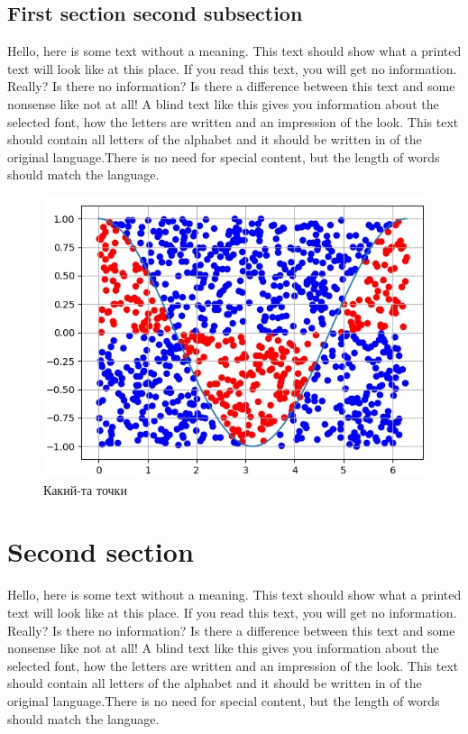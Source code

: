 \documentclass[a4paper,14pt]{extarticle}
\begin{document}
    \subsection{First section second subsection}

    Hello, here is some text without a meaning. This text should show what 
    a printed text will look like at this place. If you read this text, 
    you will get no information.  Really?  Is there no information?  Is there 
    a difference between this text and some nonsense like not at all!  A 
    blind text like this gives you information about the selected font, how 
    the letters are written and an impression of the look.  This text should
    contain all letters of the alphabet and it should be written in of the
    original language.There is no need for special content, but the length of
    words should match the language.

    \begin{figure}[H]
        \includegraphics{Points}
        \caption{Какий-та точки}
    \end{figure}

    \section{Second section}

    Hello, here is some text without a meaning.  This text should show what 
    a printed text will look like at this place.  If you read this text, 
    you will get no information.  Really?  Is there no information?  Is there 
    a difference between this text and some nonsense like not at all!  A 
    blind text like this gives you information about the selected font, how 
    the letters are written and an impression of the look.  This text should
    contain all letters of the alphabet and it should be written in of the
    original language.There is no need for special content, but the length of
    words should match the language.
\end{document}
